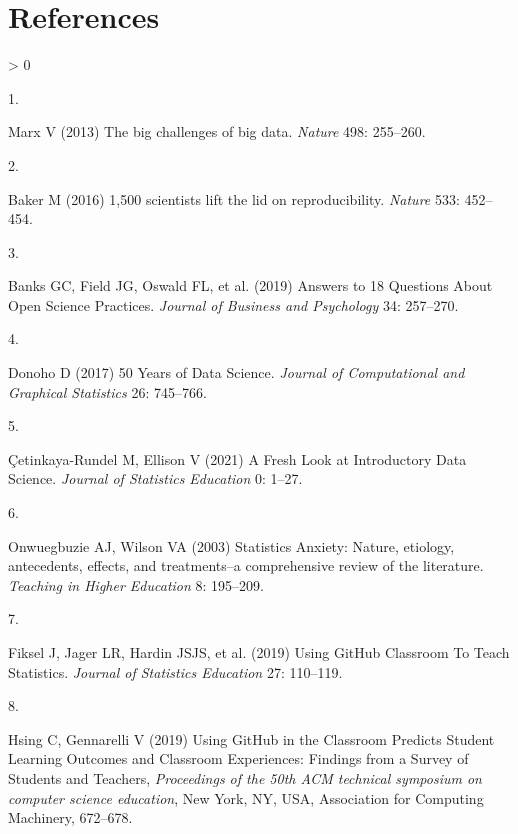 \documentclass[
]{article}
\newlength{\cslhangindent}
\newlength{\csllabelwidth}
\newenvironment{CSLReferences}[2] %
 {%
  \setlength{\parindent}{0pt}
  \ifodd #1 \everypar{\setlength{\hangindent}{\cslhangindent}}\ignorespaces\fi
  \ifnum #2 > 0
  \setlength{\parskip}{#2\baselineskip}
  \fi
 }%
 {}
\newcommand{\CSLLeftMargin}[1]{\parbox[t]{\csllabelwidth}{#1}}
\newcommand{\CSLRightInline}[1]{\parbox[t]{\linewidth - \csllabelwidth}{#1}\break}
\begin{document}
\hypertarget{references}{%
\section*{References}\label{references}}

\hypertarget{refs}{}
\begin{CSLReferences}{0}{0}
\leavevmode\hypertarget{ref-Marx2013}{}%
\CSLLeftMargin{1. }
\CSLRightInline{Marx V (2013) {The big challenges of big data}.
\emph{Nature} 498: 255--260.}

\leavevmode\hypertarget{ref-Baker2016}{}%
\CSLLeftMargin{2. }
\CSLRightInline{Baker M (2016) 1,500 scientists lift the lid on
reproducibility. \emph{Nature} 533: 452--454.}

\leavevmode\hypertarget{ref-Banks2019}{}%
\CSLLeftMargin{3. }
\CSLRightInline{Banks GC, Field JG, Oswald FL, et al. (2019) {Answers to
18 Questions About Open Science Practices}. \emph{Journal of Business
and Psychology} 34: 257--270.}

\leavevmode\hypertarget{ref-Donoho2017}{}%
\CSLLeftMargin{4. }
\CSLRightInline{Donoho D (2017) {50 Years of Data Science}.
\emph{Journal of Computational and Graphical Statistics} 26: 745--766.}

\leavevmode\hypertarget{ref-Cetinkaya-Rundel2021}{}%
\CSLLeftMargin{5. }
\CSLRightInline{Çetinkaya-Rundel M, Ellison V (2021) {A Fresh Look at
Introductory Data Science}. \emph{Journal of Statistics Education} 0:
1--27.}

\leavevmode\hypertarget{ref-Onwuegbuzie2003}{}%
\CSLLeftMargin{6. }
\CSLRightInline{Onwuegbuzie AJ, Wilson VA (2003) {Statistics Anxiety:
Nature, etiology, antecedents, effects, and treatments--a comprehensive
review of the literature}. \emph{Teaching in Higher Education} 8:
195--209.}

\leavevmode\hypertarget{ref-Fiksel2019}{}%
\CSLLeftMargin{7. }
\CSLRightInline{Fiksel J, Jager LR, Hardin JSJS, et al. (2019) {Using
GitHub Classroom To Teach Statistics}. \emph{Journal of Statistics
Education} 27: 110--119.}

\leavevmode\hypertarget{ref-Hsing2019}{}%
\CSLLeftMargin{8. }
\CSLRightInline{Hsing C, Gennarelli V (2019) {Using GitHub in the
Classroom Predicts Student Learning Outcomes and Classroom Experiences:
Findings from a Survey of Students and Teachers}, \emph{Proceedings of
the 50th ACM technical symposium on computer science education}, New
York, NY, USA, Association for Computing Machinery, 672--678.}


\end{CSLReferences}
\end{document}
